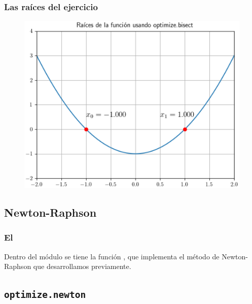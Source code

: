 \documentclass[12pt]{beamer}
\begin{document}
\begin{frame}
\frametitle{Las raíces del ejercicio}
\begin{figure}
    \centering
    \includegraphics[scale=0.55]{Imagenes/raices_scipy_bisect_02.eps}
\end{figure}
\end{frame}

\subsection{Newton-Raphson}

\begin{frame}
\frametitle{El }
Dentro del módulo  se tiene la función  , que implementa el método de Newton-Raphson que desarrollamos previamente.
\end{frame}

\subsection{\texttt{optimize.newton}}
\end{document}
